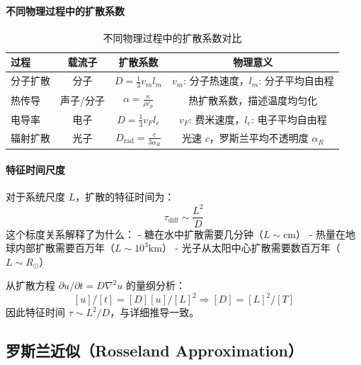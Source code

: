 \paragraph{不同物理过程中的扩散系数}

\begin{table}[h]
\centering
\caption{不同物理过程中的扩散系数对比}
\begin{tabular}{|l|c|c|c|}
\hline
\textbf{过程} & \textbf{载流子} & \textbf{扩散系数} & \textbf{物理意义} \\
\hline
分子扩散 & 分子 & $D = \frac{1}{3} v_m l_m$ & $v_m$: 分子热速度，$l_m$: 分子平均自由程 \\
热传导 & 声子/分子 & $\alpha = \frac{\kappa}{\rho c_p}$ & 热扩散系数，描述温度均匀化 \\
电导率 & 电子 & $D = \frac{1}{3} v_F l_e$ & $v_F$: 费米速度，$l_e$: 电子平均自由程 \\
辐射扩散 & 光子 & $D_{\text{rad}} = \frac{c}{3\alpha_R}$ & 光速 $c$，罗斯兰平均不透明度 $\alpha_R$ \\
\hline
\end{tabular}
\end{table}


\paragraph{特征时间尺度}
对于系统尺度 $L$，扩散的特征时间为：
\[
\tau_{\text{diff}} \sim \frac{L^2}{D}
\]
这个标度关系解释了为什么：
- 糖在水中扩散需要几分钟（$L \sim \text{cm}$）
- 热量在地球内部扩散需要百万年（$L \sim 10^3 \text{km}$）
- 光子从太阳中心扩散需要数百万年（$L \sim R_\odot$）

\begin{derivationnote}[量纲分析推导]
从扩散方程 $\partial u/\partial t = D\nabla^2 u$ 的量纲分析：
\[
[u]/[t] = [D][u]/[L]^2 \Rightarrow [D] = [L]^2/[T]
\]
因此特征时间 $\tau \sim L^2/D$，与详细推导一致。
\end{derivationnote}

\subsection{罗斯兰近似（Rosseland Approximation）}


